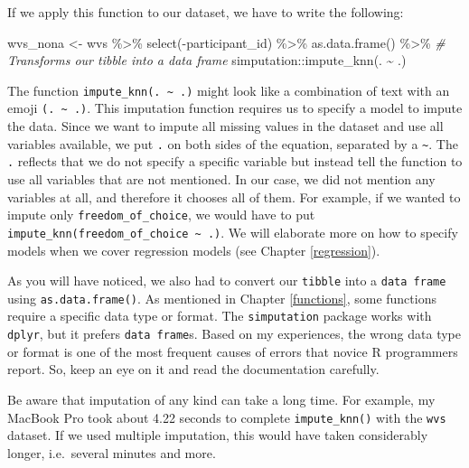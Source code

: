 \documentclass[
]{book}
\newenvironment{Shaded}{\begin{snugshade}}{\end{snugshade}}
\newcommand{\CommentTok}[1]{\textcolor[rgb]{0.56,0.35,0.01}{\textit{#1}}}
\newcommand{\FunctionTok}[1]{\textcolor[rgb]{0.00,0.00,0.00}{#1}}
\newcommand{\NormalTok}[1]{#1}
\newcommand{\OtherTok}[1]{\textcolor[rgb]{0.56,0.35,0.01}{#1}}
\newcommand{\SpecialCharTok}[1]{\textcolor[rgb]{0.00,0.00,0.00}{#1}}
\begin{document}
If we apply this function to our dataset, we have to write the following:

\begin{Shaded}
\begin{Highlighting}[]
\NormalTok{wvs\_nona }\OtherTok{\textless{}{-}}\NormalTok{ wvs }\SpecialCharTok{\%\textgreater{}\%}
  \FunctionTok{select}\NormalTok{(}\SpecialCharTok{{-}}\NormalTok{participant\_id) }\SpecialCharTok{\%\textgreater{}\%} 
  \FunctionTok{as.data.frame}\NormalTok{() }\SpecialCharTok{\%\textgreater{}\%}                  \CommentTok{\# Transforms our tibble into a data frame}
\NormalTok{  simputation}\SpecialCharTok{::}\FunctionTok{impute\_knn}\NormalTok{(. }\SpecialCharTok{\textasciitilde{}}\NormalTok{ .)}
\end{Highlighting}
\end{Shaded}

The function \texttt{impute\_knn(.\ \textasciitilde{}\ .)} might look like a combination of text with an emoji \texttt{(.\ \textasciitilde{}\ .)}. This imputation function requires us to specify a model to impute the data. Since we want to impute all missing values in the dataset and use all variables available, we put \texttt{.} on both sides of the equation, separated by a \texttt{\textasciitilde{}}. The \texttt{.} reflects that we do not specify a specific variable but instead tell the function to use all variables that are not mentioned. In our case, we did not mention any variables at all, and therefore it chooses all of them. For example, if we wanted to impute only \texttt{freedom\_of\_choice}, we would have to put \texttt{impute\_knn(freedom\_of\_choice\ \textasciitilde{}\ .)}. We will elaborate more on how to specify models when we cover regression models (see Chapter \ref{regression}).

As you will have noticed, we also had to convert our \texttt{tibble} into a \texttt{data\ frame} using \texttt{as.data.frame()}. As mentioned in Chapter \ref{functions}, some functions require a specific data type or format. The \texttt{simputation} package works with \texttt{dplyr}, but it prefers \texttt{data\ frame}s. Based on my experiences, the wrong data type or format is one of the most frequent causes of errors that novice R programmers report. So, keep an eye on it and read the documentation carefully.

Be aware that imputation of any kind can take a long time. For example, my MacBook Pro took about 4.22 seconds to complete \texttt{impute\_knn()} with the \texttt{wvs} dataset. If we used multiple imputation, this would have taken considerably longer, i.e.~several minutes and more.
\end{document}
